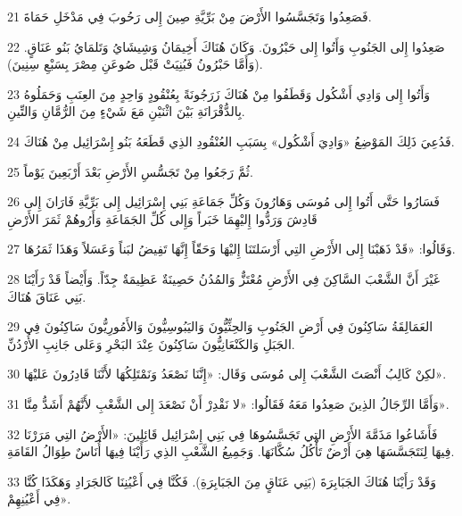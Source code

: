 \par 21 فَصَعِدُوا وَتَجَسَّسُوا الأَرْضَ مِنْ بَرِّيَّةِ صِينَ إِلى رَحُوبَ فِي مَدْخَلِ حَمَاةَ.
\par 22 صَعِدُوا إِلى الجَنُوبِ وَأَتُوا إِلى حَبْرُونَ. وَكَانَ هُنَاكَ أَخِيمَانُ وَشِيشَايُ وَتَلمَايُ بَنُو عَنَاقٍ. (وَأَمَّا حَبْرُونُ فَبُنِيَتْ قَبْل صُوعَنِ مِصْرَ بِسَبْعِ سِنِينَ).
\par 23 وَأَتُوا إِلى وَادِي أَشْكُول وَقَطَفُوا مِنْ هُنَاكَ زَرَجُونَةً بِعُنْقُودٍ وَاحِدٍ مِنَ العِنَبِ وَحَمَلُوهُ بِالدُّقْرَانَةِ بَيْنَ اثْنَيْنِ مَعَ شَيْءٍ مِنَ الرُّمَّانِ وَالتِّينِ.
\par 24 فَدُعِيَ ذَلِكَ المَوْضِعُ «وَادِيَ أَشْكُول» بِسَبَبِ العُنْقُودِ الذِي قَطَعَهُ بَنُو إِسْرَائِيل مِنْ هُنَاكَ.
\par 25 ثُمَّ رَجَعُوا مِنْ تَجَسُّسِ الأَرْضِ بَعْدَ أَرْبَعِينَ يَوْماً.
\par 26 فَسَارُوا حَتَّى أَتُوا إِلى مُوسَى وَهَارُونَ وَكُلِّ جَمَاعَةِ بَنِي إِسْرَائِيل إِلى بَرِّيَّةِ فَارَانَ إِلى قَادِشَ وَرَدُّوا إِليْهِمَا خَبَراً وَإِلى كُلِّ الجَمَاعَةِ وَأَرُوهُمْ ثَمَرَ الأَرْضِ
\par 27 وَقَالُوا: «قَدْ ذَهَبْنَا إِلى الأَرْضِ التِي أَرْسَلتَنَا إِليْهَا وَحَقّاً إِنَّهَا تَفِيضُ لبَناً وَعَسَلاً وَهَذَا ثَمَرُهَا.
\par 28 غَيْرَ أَنَّ الشَّعْبَ السَّاكِنَ فِي الأَرْضِ مُعْتَزٌّ وَالمُدُنُ حَصِينَةٌ عَظِيمَةٌ جِدّاً. وَأَيْضاً قَدْ رَأَيْنَا بَنِي عَنَاقَ هُنَاكَ.
\par 29 العَمَالِقَةُ سَاكِنُونَ فِي أَرْضِ الجَنُوبِ وَالحِثِّيُّونَ وَاليَبُوسِيُّونَ وَالأَمُورِيُّونَ سَاكِنُونَ فِي الجَبَلِ وَالكَنْعَانِيُّونَ سَاكِنُونَ عِنْدَ البَحْرِ وَعَلى جَانِبِ الأُرْدُنِّ.
\par 30 لكِنْ كَالِبُ أَنْصَتَ الشَّعْبَ إِلى مُوسَى وَقَال: «إِنَّنَا نَصْعَدُ وَنَمْتَلِكُهَا لأَنَّنَا قَادِرُونَ عَليْهَا».
\par 31 وَأَمَّا الرِّجَالُ الذِينَ صَعِدُوا مَعَهُ فَقَالُوا: «لا نَقْدِرْ أَنْ نَصْعَدَ إِلى الشَّعْبِ لأَنَّهُمْ أَشَدُّ مِنَّا».
\par 32 فَأَشَاعُوا مَذَمَّةَ الأَرْضِ التِي تَجَسَّسُوهَا فِي بَنِي إِسْرَائِيل قَائِلِينَ: «الأَرْضُ التِي مَرَرْنَا فِيهَا لِنَتَجَسَّسَهَا هِيَ أَرْضٌ تَأْكُلُ سُكَّانَهَا. وَجَمِيعُ الشَّعْبِ الذِي رَأَيْنَا فِيهَا أُنَاسٌ طِوَالُ القَامَةِ.
\par 33 وَقَدْ رَأَيْنَا هُنَاكَ الجَبَابِرَةَ (بَنِي عَنَاقٍ مِنَ الجَبَابِرَةِ). فَكُنَّا فِي أَعْيُنِنَا كَالجَرَادِ وَهَكَذَا كُنَّا فِي أَعْيُنِهِمْ».

